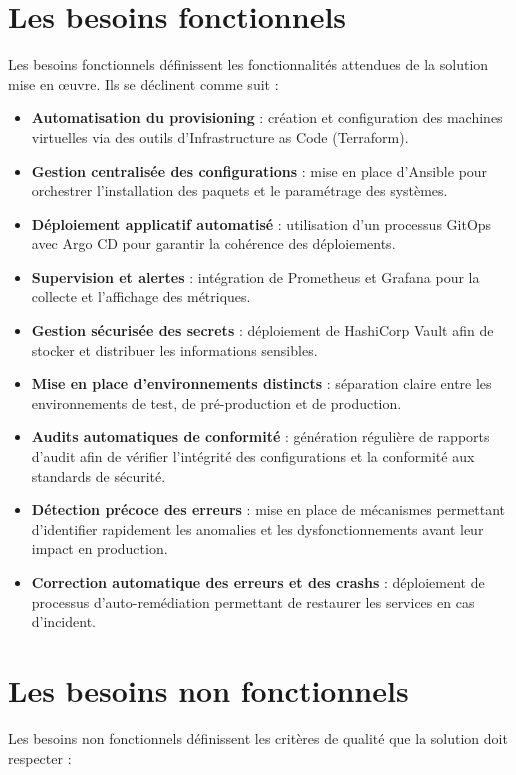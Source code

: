 \section{Les besoins fonctionnels}

Les besoins fonctionnels définissent les fonctionnalités attendues de la solution mise en œuvre. Ils se déclinent comme suit :

\begin{itemize}
	\item \textbf{Automatisation du provisioning} : création et configuration des machines virtuelles via des outils d'Infrastructure as Code (Terraform).
	\item \textbf{Gestion centralisée des configurations} : mise en place d'Ansible pour orchestrer l'installation des paquets et le paramétrage des systèmes.
	\item \textbf{Déploiement applicatif automatisé} : utilisation d'un processus GitOps avec Argo CD pour garantir la cohérence des déploiements.
	\item \textbf{Supervision et alertes} : intégration de Prometheus et Grafana pour la collecte et l'affichage des métriques.
	\item \textbf{Gestion sécurisée des secrets} : déploiement de HashiCorp Vault afin de stocker et distribuer les informations sensibles.
	\item \textbf{Mise en place d'environnements distincts} : séparation claire entre les environnements de test, de pré-production et de production.
	\item \textbf{Audits automatiques de conformité} : génération régulière de rapports d'audit afin de vérifier l'intégrité des configurations et la conformité aux standards de sécurité.
	\item \textbf{Détection précoce des erreurs} : mise en place de mécanismes permettant d'identifier rapidement les anomalies et les dysfonctionnements avant leur impact en production.
	\item \textbf{Correction automatique des erreurs et des crashs} : déploiement de processus d'auto-remédiation permettant de restaurer les services en cas d'incident.
\end{itemize}

\section{Les besoins non fonctionnels}

Les besoins non fonctionnels définissent les critères de qualité que la solution doit respecter :

